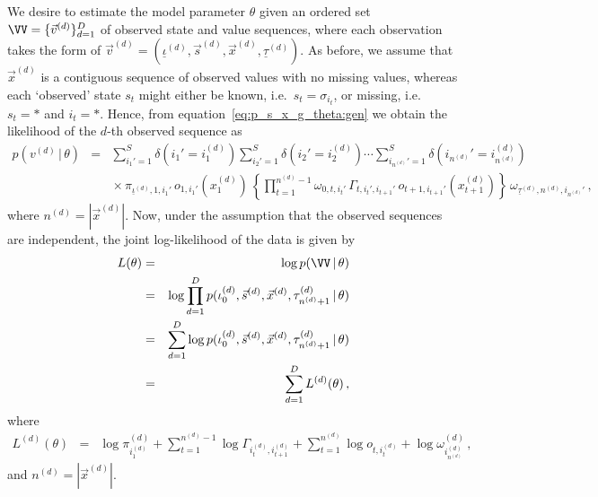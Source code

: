 \documentclass[a4paper]{article}
\begin{document}
We desire to estimate the model parameter $\theta$ given an ordered set $\VV=\{\vec{v}^{(d)}\}_{d=1}^{D}$ of observed state and value sequences,
where each observation takes the form of $\vec{v}^{(d)}=(\underline{\iota}^{(d)},\vec{s}^{(d)},\vec{x}^{(d)},\underline{\tau}^{(d)})$.
As before, we assume that $\vec{x}^{(d)}$ is a contiguous sequence of observed values with no missing values, whereas each `observed' state
$s_t$ might either be known, i.e.\ $s_t=\sigma_{i_t}$, or missing, i.e.\ $s_t=*$ and $i_t=*$.
Hence, from equation~\eqref{eq:p_s_x_g_theta:gen} we obtain the likelihood of the $d$-th observed sequence as
\begin{eqnarray}
  p(v^{(d)}\,|\,\theta) & = & 
   \sum_{i_1'=1}^{S}\delta(i_1'\!=\!i_1^{(d)})\sum_{i_2'=1}^{S}\delta(i_2'\!=\!i_2^{(d)})\cdots\sum_{i_{n^{(d)}}'=1}^{S}\delta(i_{n^{(d)}}'\!=\!i_{n^{(d)}}^{(d)})\,
\nonumber\\&&{}\times\pi_{\underline{\iota}^{(d)},1,i_1'}\,o_{1,i_1'}(x_1^{(d)})\,
\left\{\prod_{t=1}^{n^{(d)}-1}\omega_{0,t,i_t'}\,\Gamma_{t,i_t',i_{t+1}'}\,o_{t+1,i_{t+1}'}(x_{t+1}^{(d)})
\right\}\,\omega_{\underline{\tau}^{(d)},{n^{(d)}},i_{n^{(d)}}'}\,,
\end{eqnarray}
where $n^{(d)}=|\vec{x}^{(d)}|$.
Now, under the assumption that the observed sequences are independent, the joint log-likelihood of the data is given by
\begin{eqnarray}
  L(\theta) & = & \log p(\VV\,|\,\theta) 
\nonumber\\& = & 
\log\prod_{d=1}^D 
p(\iota_0^{(d)},\vec{s}^{(d)},\vec{x}^{(d)},\tau_{n^{(d)}+1}^{(d)}\,|\,\theta) 
\nonumber\\& = & 
\sum_{d=1}^D\log 
p(\iota_0^{(d)},\vec{s}^{(d)},\vec{x}^{(d)},\tau_{n^{(d)}+1}^{(d)}\,|\,\theta) 
\nonumber\\& = & 
\sum_{d=1}^D L^{(d)}(\theta)
\,,
\end{eqnarray}
where
\begin{eqnarray}
  L^{(d)}(\theta) & = &
   \log\pi_{i_1^{(d)}}^{(d)}
 + \sum_{t=1}^{n^{(d)}-1}\log\Gamma_{i_t^{(d)},i_{t+1}^{(d)}}
 + \sum_{t=1}^{n^{(d)}}\log o_{t,i_t^{(d)}}
 + \log\omega_{i_{n^{(d)}}^{(d)}}^{(d)}
\,,
\end{eqnarray}
and $n^{(d)}=|\vec{x}^{(d)}|$.
\end{document}
